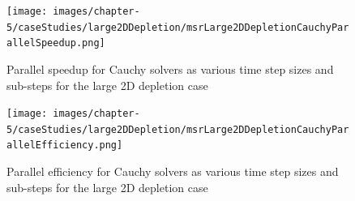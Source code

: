 \clearpage

\begin{figure}[p]
    \centering
    \texttt{[image: images/chapter-5/caseStudies/large2DDepletion/msrLarge2DDepletionCauchyParallelSpeedup.png]}
    \caption{Parallel speedup for Cauchy solvers as various time step sizes and sub-steps for the large 2D depletion case}
    \label{fig:large_2D_depletion_cauchy_speedup}
\end{figure}

\clearpage

\begin{figure}[p]
    \centering
    \texttt{[image: images/chapter-5/caseStudies/large2DDepletion/msrLarge2DDepletionCauchyParallelEfficiency.png]}
    \caption{Parallel efficiency for Cauchy solvers as various time step sizes and sub-steps for the large 2D depletion case}
    \label{fig:large_2D_depletion_cauchy_parallel_eff}
\end{figure}
